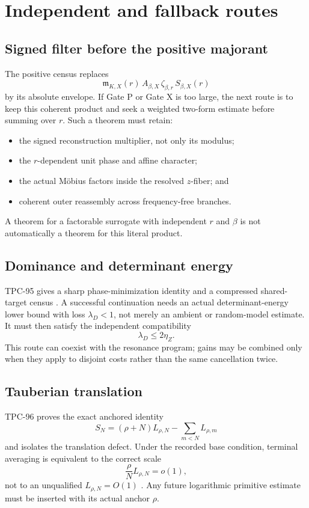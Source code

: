 \section{Independent and fallback routes}
\label{sec:alternative-routes}

\subsection{Signed filter before the positive majorant}

The positive census replaces
\[
 \mathfrak m_{K,X}(r)\,
 A_{\beta,X}\,
 \zeta_{\beta,r}\,
 S_{\beta,X}(r)
\]
by its absolute envelope.  If Gate P or Gate X is too large, the
next route is to keep this coherent product and seek a weighted
two-form estimate before summing over \(r\).  Such a theorem must
retain:
\begin{itemize}[leftmargin=2em]
\item the signed reconstruction multiplier, not only its modulus;
\item the \(r\)-dependent unit phase and affine character;
\item the actual M\"obius factors inside the resolved \(z\)-fiber;
  and
\item coherent outer reassembly across frequency-free branches.
\end{itemize}
A theorem for a factorable surrogate with independent \(r\) and
\(\beta\) is not automatically a theorem for this literal product.

\subsection{Dominance and determinant energy}

TPC-95 gives a sharp phase-minimization identity and a compressed
shared-target census \citep{WangTPC95}.  A successful continuation
needs an actual determinant-energy lower bound with loss
\(\lambda_D<1\), not merely an ambient or random-model estimate.
It must then satisfy the independent compatibility
\[
 \lambda_D\le2\eta_Z.
\]
This route can coexist with the resonance program; gains may be
combined only when they apply to disjoint costs rather than the same
cancellation twice.

\subsection{Tauberian translation}

TPC-96 proves the exact anchored identity
\[
 S_N=(\rho+N)L_{\rho,N}
 -\sum_{m<N}L_{\rho,m}
\]
and isolates the translation defect.  Under the recorded base
condition, terminal averaging is equivalent to the correct scale
\[
 \frac{\rho}{N}L_{\rho,N}=o(1),
\]
not to an unqualified \(L_{\rho,N}=O(1)\)
\citep{WangTPC96}.  Any future logarithmic primitive estimate must
be inserted with its actual anchor \(\rho\).

